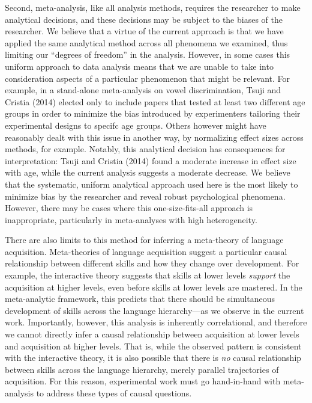 \documentclass[english,floatsintext,man]{apa6}
\begin{document}
Second, meta-analysis, like all analysis methods, requires the
researcher to make analytical decisions, and these decisions may be
subject to the biases of the researcher. We believe that a virtue of the
current approach is that we have applied the same analytical method
across all phenomena we examined, thus limiting our \enquote{degrees of
freedom} in the analysis. However, in some cases this uniform approach
to data analysis means that we are unable to take into consideration
aspects of a particular phenomenon that might be relevant. For example,
in a stand-alone meta-analysis on vowel discrimination, Tsuji and
Cristia (2014) elected only to include papers that tested at least two
different age groups in order to minimize the bias introduced by
experimenters tailoring their experimental designs to specifc age
groups. Others however might have reasonably dealt with this issue in
another way, by normalizing effect sizes across methods, for example.
Notably, this analytical decision has consequences for interpretation:
Tsuji and Cristia (2014) found a moderate increase in effect size with
age, while the current analysis suggests a moderate decrease. We believe
that the systematic, uniform analytical approach used here is the most
likely to minimize bias by the researcher and reveal robust
psychological phenomena. However, there may be cases where this
one-size-fits-all approach is inappropriate, particularly in
meta-analyses with high heterogeneity.

There are also limits to this method for inferring a meta-theory of
language acquisition. Meta-theories of language acquisition suggest a
particular causal relationship between different skills and how they
change over development. For example, the interactive theory suggests
that skills at lower levels \emph{support} the acquisition at higher
levels, even before skills at lower levels are mastered. In the
meta-analytic framework, this predicts that there should be simultaneous
development of skills across the language hierarchy---as we observe in
the current work. Importantly, however, this analysis is inherently
correlational, and therefore we cannot directly infer a causal
relationship between acquisition at lower levels and acquisition at
higher levels. That is, while the observed pattern is consistent with
the interactive theory, it is also possible that there is \emph{no}
causal relationship between skills across the language hierarchy, merely
parallel trajectories of acquisition. For this reason, experimental work
must go hand-in-hand with meta-analysis to address these types of causal
questions.
\end{document}
